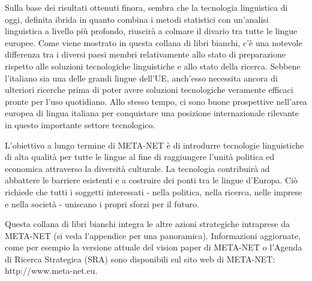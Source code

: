 \documentclass[]{../../metanetpaper}
\begin{document}
\begin{multicols}{2}

Sulla base dei risultati ottenuti finora, sembra che la tecnologia linguistica
di oggi, definita ibrida in quanto combina i metodi statistici con un'analisi 
linguistica a livello pi\`{u} profondo, riuscir\`{a} a colmare il divario tra tutte le
lingue europee. Come viene mostrato in questa collana di libri bianchi,
c'\`{e} una notevole differenza tra i diversi paesi membri relativamente allo
stato di preparazione rispetto alle soluzioni tecnologiche linguistiche e allo
stato della ricerca. Sebbene l'italiano sia una delle grandi lingue
dell'UE, anch'esso necessita ancora di ulteriori ricerche prima di poter avere
soluzioni tecnologiche veramente efficaci pronte per l'uso quotidiano. Allo
stesso tempo, ci sono buone prospettive nell'area europea di lingua italiana
per conquistare una posizione internazionale rilevante in questo
importante settore tecnologico.

L'obiettivo a lungo termine di META-NET \`{e} di introdurre tecnologie
linguistiche di alta qualit\`{a} per tutte le lingue al fine di raggiungere
l'unit\`{a} politica ed economica attraverso la diversit\`{a} culturale. La
tecnologia contribuir\`{a} ad abbattere le barriere esistenti e a costruire
dei ponti tra le lingue d'Europa. Ci\`{o} richiede che tutti i soggetti
interessati - nella politica, nella ricerca, nelle imprese e nella societ\`{a}
- uniscano i propri sforzi per il futuro.

Questa collana di libri bianchi integra le altre azioni strategiche intraprese da 
META-NET (si veda l'appendice per una panoramica). Informazioni aggiornate,
come per esempio la versione attuale del vision paper di META-NET \cite{Meta1}
o l'Agenda di Ricerca Strategica (SRA) sono disponibili sul sito web di META-NET: 
http://www.meta-net.eu.

\end{multicols}

\clearpage


\end{document}
